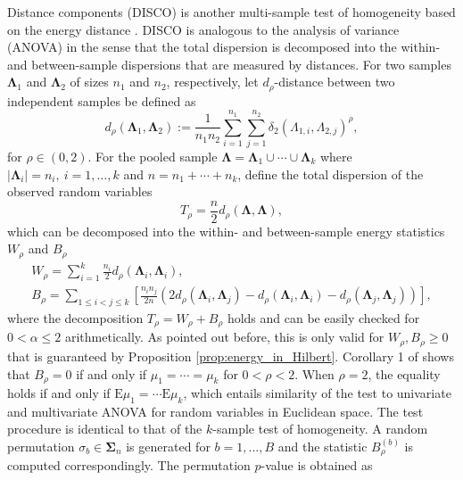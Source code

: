 \documentclass[12pt]{article}
\newcommand{\bfLambda}{\mathbf{\Lambda}}
\newcommand{\rmE}{\textrm{E}}
\begin{document}
Distance components (DISCO) is another multi-sample test of homogeneity based on the energy distance \citep{rizzo_disco_2010-1}. DISCO is analogous to the analysis of variance (ANOVA) in the sense that the total dispersion is decomposed into the within- and between-sample dispersions that are measured by distances. For two samples $\bfLambda_1$ and $\bfLambda_2$ of sizes $n_1$ and $n_2$, respectively, let $d_\rho$-distance %
between two independent samples be defined as 
\begin{equation}\label{eq:dist_d_alpha}
d_\rho (\bfLambda_1, \bfLambda_2) := \frac{1}{n_1 n_2} \sum_{i=1}^{n_1} \sum_{j=1}^{n_2} \delta_2 (\Lambda_{1,i}, \Lambda_{2,j})^\rho,
\end{equation}
for $\rho \in (0,2)$. For the pooled sample $\bfLambda = \bfLambda_1 \cup \cdots \cup \bfLambda_k$ where $|\bfLambda_i| = n_i,~i=1,\ldots,k$ and $n = n_1+\cdots+n_k$, define the total dispersion of the observed random variables
\begin{equation}\label{eq:dispersion_total}
T_\rho = \frac{n}{2} d_\rho (\bfLambda, \bfLambda),
\end{equation}
which can be decomposed into the within- and between-sample energy statistics $W_\rho$ and $B_\rho$ %
\begin{gather}
W_\rho = \sum_{i=1}^k \frac{n_i}{2} d_\rho (\bfLambda_i, \bfLambda_i), \label{eq:dispersion_within}\\
B_\rho = \sum_{1 \leq i<j \leq k} \left\lbrack \frac{n_i n_j}{2n} \left( 2 d_\rho(\bfLambda_i, \bfLambda_j) - d_\rho (\bfLambda_i, \bfLambda_i) - d_\rho (\bfLambda_j, \bfLambda_j) \right) \right\rbrack,\label{eq:dispersion_between}
\end{gather}
where the decomposition $T_\rho = W_\rho + B_\rho$ holds and can be easily checked for $0 < \alpha \leq 2$ arithmetically. As pointed out before, this is only valid for $W_\rho, B_\rho \geq 0$ that is guaranteed by Proposition \ref{prop:energy_in_Hilbert}. Corollary 1 of \cite{rizzo_disco_2010-1} shows that $B_\rho = 0$ if and only if $\mu_1 = \cdots = \mu_k$ for $0 < \rho < 2$. When $\rho=2$, the equality holds if and only if $\rmE \mu_1 = \cdots \rmE \mu_k$, which entails similarity of the test to univariate and multivariate ANOVA for random variables in Euclidean space. The test procedure is identical to that of the $k$-sample test of homogeneity. A random permutation $\sigma_b \in \boldsymbol{\Sigma}_n$ is generated for $b=1,\ldots,B$ and  the statistic $B_{\rho}^{(b)}$ is computed correspondingly. The permutation $p$-value  is obtained as
\end{document}
